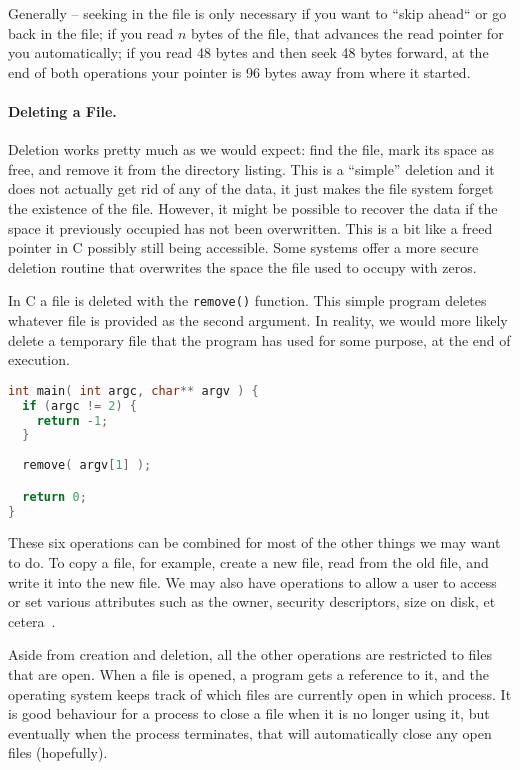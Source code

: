 Generally -- seeking in the file is only necessary if you want to ``skip ahead`` or go back in the file; if you read $n$ bytes of the file, that advances the read pointer for you automatically; if you read 48 bytes and then seek 48 bytes forward, at the end of both operations your pointer is 96 bytes away from where it started.

\paragraph{Deleting a File.} Deletion works pretty much as we would expect: find the file, mark its space as free, and remove it from the directory listing. This is a ``simple'' deletion and it does not actually get rid of any of the data, it just makes the file system forget the existence of the file. However, it might be possible to recover the data if the space it previously occupied has not been overwritten. This is a bit like a freed pointer in C possibly still being accessible. Some systems offer a more secure deletion routine that overwrites the space the file used to occupy with zeros.

In C a file is deleted with the \texttt{remove()} function. This simple program deletes whatever file is provided as the second argument. In reality, we would more likely delete a temporary file that the program has used for some purpose, at the end of execution.

\begin{lstlisting}[language=C]
int main( int argc, char** argv ) {
  if (argc != 2) {
    return -1;
  }
  
  remove( argv[1] );

  return 0;
}    
\end{lstlisting}


These six operations can be combined for most of the other things we may want to do. To copy a file, for example, create a new file, read from the old file, and write it into the new file. We may also have operations to allow a user to access or set various attributes such as the owner, security descriptors, size on disk, et cetera~\cite{osc}.

Aside from creation and deletion, all the other operations are restricted to files that are open. When a file is opened, a program gets a reference to it, and the operating system keeps track of which files are currently open in which process. It is good behaviour for a process to close a file when it is no longer using it, but eventually when the process terminates, that will automatically close any open files (hopefully).

